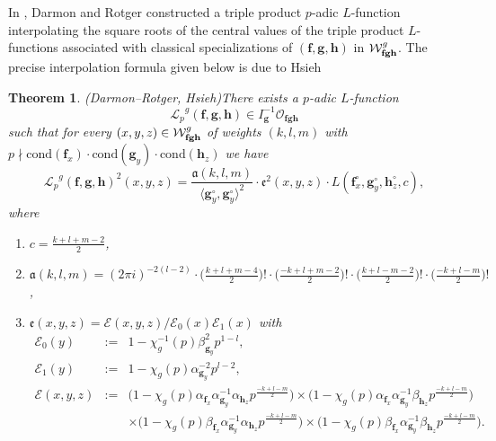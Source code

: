 \documentclass[a4paper,11pt]{amsart}
\theoremstyle{plain}
\newtheorem{theorem}{Theorem}[section]
\theoremstyle{definition}
\theoremstyle{remark}
\newcommand{\cl}{\mathcal}
\DeclareMathOperator{\Spf}{Spf}
\newcommand{\Lp}{{\mathscr{L}_p}}
\newcommand{\hf}{{\mathbf{f}}}
\newcommand{\hg}{{\mathbf{g}}}
\newcommand{\hh}{{\mathbf h}}
\numberwithin{equation}{section}
\begin{document}

In \cite{DR1}, Darmon and Rotger constructed a triple product $p$-adic $L$-function interpolating the square roots of the central values of the triple product $L$-functions associated with classical specializations of $(\hf,\hg,\hh)$ in $\mathcal W_{{\bf fgh}}^g$. The precise interpolation formula given below is due to Hsieh \cite{Hs}

\begin{theorem}(Darmon--Rotger, Hsieh)\label{thm:hsieh}
There exists a $p$-adic $L$-function
\[
\Lp^g(\hf,\hg,\hh) \in I_\hg^{-1}\cl{O}_{\hf \hg \hh}
\]
such that for every $(x,y,z) \in \mathcal W_{{\bf fgh}}^g$ of weights $(k,l,m)$ with $p\nmid \mathrm{cond}(\hf_x)\cdot\mathrm{cond}(\hg_y)\cdot\mathrm{cond}(\hh_z)$ we have
\[
\Lp^g(\hf,\hg,\hh)^2(x,y,z) = \frac{\mathfrak a(k,l,m)}{\langle \hg_y^{\circ},\hg_y^{\circ} \rangle^2} \cdot \mathfrak e^2(x,y,z) \cdot L(\hf_x^{\circ},\hg_y^{\circ},\hh_z^{\circ},c),
\]
where
\begin{enumerate}
\item $c = \frac{k+l+m-2}{2}$,
\item $\mathfrak a(k,l,m) = (2\pi i)^{-2(l-2)} \cdot \Big( \frac{k+l+m-4}{2} \Big) ! \cdot \Big( \frac{-k+l+m-2}{2} \Big) ! \cdot \Big( \frac{k+l-m-2}{2} \Big) ! \cdot \Big( \frac{-k+l-m}{2} \Big) !$,
\item $\mathfrak e(x,y,z) = \mathcal E(x,y,z)/\mathcal E_0(x) \mathcal E_1(x)$ with
    \begin{eqnarray}
      \nonumber \mathcal E_0(y) &:=& 1-\chi_g^{-1}(p) \beta_{\hg_y}^2p^{1-l}, \\
      \nonumber \mathcal E_1(y) &:=& 1-\chi_g(p)\alpha_{\hg_y}^{-2}p^{l-2}, \\
      \nonumber \mathcal E(x,y,z) &:=& \Big(1-\chi_g(p) \alpha_{\hf_x} \alpha_{\hg_y}^{-1}\alpha_{\hh_z}p^{\frac{-k+l-m}{2}} \Big) \times \Big(1-\chi_g(p) \alpha_{\hf_x} \alpha_{\hg_y}^{-1}\beta_{\hh_z}p^{\frac{-k+l-m}{2}} \Big)\\ \nonumber
       & & \times \Big(1-\chi_g(p) \beta_{\hf_x} \alpha_{\hg_y}^{-1}\alpha_{\hh_z}p^{\frac{-k+l-m}{2}} \Big) \times \Big(1-\chi_g(p) \beta_{\hf_x} \alpha_{\hg_y}^{-1}\beta_{\hh_z}p^{\frac{-k+l-m}{2}} \Big).
    \end{eqnarray}
\end{enumerate}
\end{theorem}
\end{document}
